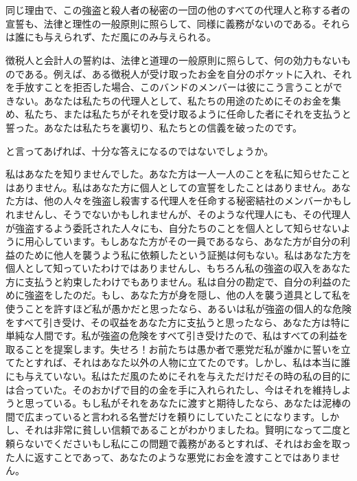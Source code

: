 \documentclass[dvipdfmx, uplatex, tate, landscape]{utbook}
\begin{document}
\chapter{}

同じ理由で、この強盗と殺人者の秘密の一団の他のすべての代理人と称する者の宣誓も、法律と理性の一般原則に照らして、同様に義務がないのである。それらは誰にも与えられず、ただ風にのみ与えられる。

徴税人と会計人の誓約は、法律と道理の一般原則に照らして、何の効力もないものである。例えば、ある徴税人が受け取ったお金を自分のポケットに入れ、それを手放すことを拒否した場合、このバンドのメンバーは彼にこう言うことができない。あなたは私たちの代理人として、私たちの用途のためにそのお金を集め、私たち、または私たちがそれを受け取るように任命した者にそれを支払うと誓った。あなたは私たちを裏切り、私たちとの信義を破ったのです。

と言ってあげれば、十分な答えになるのではないでしょうか。

私はあなたを知りませんでした。あなた方は一人一人のことを私に知らせたことはありません。私はあなた方に個人としての宣誓をしたことはありません。あなた方は、他の人々を強盗し殺害する代理人を任命する秘密結社のメンバーかもしれませんし、そうでないかもしれませんが、そのような代理人にも、その代理人が強盗するよう委託された人々にも、自分たちのことを個人として知らせないように用心しています。もしあなた方がその一員であるなら、あなた方が自分の利益のために他人を襲うよう私に依頼したという証拠は何もない。私はあなた方を個人として知っていたわけではありませんし、もちろん私の強盗の収入をあなた方に支払うと約束したわけでもありません。私は自分の勘定で、自分の利益のために強盗をしたのだ。もし、あなた方が身を隠し、他の人を襲う道具として私を使うことを許すほど私が愚かだと思ったなら、あるいは私が強盗の個人的な危険をすべて引き受け、その収益をあなた方に支払うと思ったなら、あなた方は特に単純な人間です。私が強盗の危険をすべて引き受けたので、私はすべての利益を取ることを提案します。失せろ！お前たちは愚か者で悪党だ私が誰かに誓いを立てたとすれば、それはあなた以外の人物に立てたのです。しかし、私は本当に誰にも与えていない。私はただ風のためにそれを与えただけだその時の私の目的には合っていた。そのおかげで目的の金を手に入れられたし、今はそれを維持しようと思っている。もし私がそれをあなたに渡すと期待したなら、あなたは泥棒の間で広まっていると言われる名誉だけを頼りにしていたことになります。しかし、それは非常に貧しい信頼であることがわかりましたね。賢明になって二度と頼らないでくださいもし私にこの問題で義務があるとすれば、それはお金を取った人に返すことであって、あなたのような悪党にお金を渡すことではありません。
\end{document}
